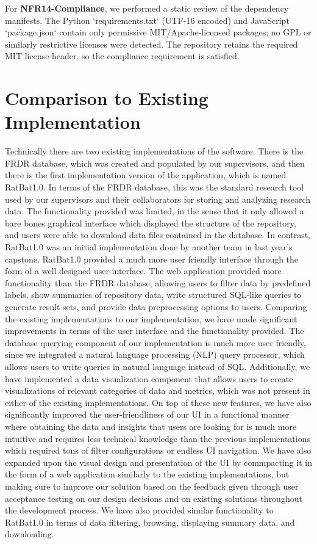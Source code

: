 \documentclass[12pt, titlepage]{article}
\begin{document}
For \textbf{NFR14-Compliance}, we performed a static review of the dependency manifests. The Python `requirements.txt` (UTF-16 encoded) and JavaScript `package.json` contain only permissive MIT/Apache‑licensed packages; no GPL or similarly restrictive licenses were detected. The repository retains the required MIT license header, so the compliance requirement is satisfied.

	
\section{Comparison to Existing Implementation}	

\par{Technically there are two existing implementations of the software. There is the FRDR database,
which was created and populated by our supervisors, and then there is the first implementation 
version of the application, which is named RatBat1.0. In terms of the FRDR database, this was the 
standard research tool used by our supervisors and their collaborators for storing and analyzing 
research data. The functionality provided was limited, in the sense that it only allowed a bare bones
graphical interface which displayed the structure of the repository, and users were able to download data files
contained in the database. In contrast, RatBat1.0 was an initial implementation done by another team in 
last year's capstone. RatBat1.0 provided a much more user friendly interface through the form of 
a well designed user-interface. The web application provided more functionality than the FRDR database, 
allowing users to filter data by predefined labels, show summaries of repository data, write structured 
SQL-like queries to generate result sets, and provide data preprocessing options to users. 
Comparing the existing implementations to our implementation, we have made 
significant improvements in terms of the user interface and the functionality provided. The database 
querying component of our implementation is much more user friendly, since we integrated a natural language 
processing (NLP) query processor, which allows users to write queries in natural language instead of SQL. 
Additionally, we have implemented a data visualization component that allows users to create visualizations of 
relevant categories of data and metrics, which was not present in either of the existing implementations. 
On top of these new features, we have also significantly improved the user-friendliness of our UI in a functional manner 
where obtaining the data and insights that users are looking for is much more intuitive and requires less technical knowledge 
than the previous implementations which required tons of filter configurations or endless UI navigation. We have also expanded 
upon the visual design and presentation of the UI by commpacting it in the form of a web application similarly to the existing implementations, 
but making sure to improve our solution based on the feedback given through user acceptance testing on our design decisions and on existing 
solutions throughout the development process. We have also provided similar functionality to RatBat1.0 in terms of data filtering, browsing, displaying summary data, and downloading.}
\end{document}
